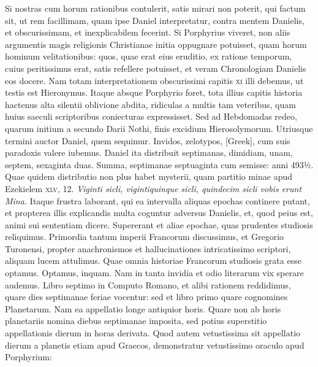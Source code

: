 Si nostras cum horum
rationibus contulerit, satis mirari non poterit, qui factum
sit, ut rem facillimam, quam ipse Daniel interpretatur, contra mentem
Danielis, et obscurissimam, et inexplicabilem fecerint.
Si Porphyrius
viveret, non aliis argumentis magis religionis Christianae
initia oppugnare potuisset, quam horum hominum velitationibus:
quos, quae erat eius eruditio, ex ratione temporum, cuius peritissimus
erat, satis refellere potuisset, et veram Chronologiam
Danielis eos docere.
Nam totam interpretationem obscurissimi
capitis \textsc{xi} illi debemus, ut testis est Hieronymus.
Itaque
absque Porphyrio foret, tota illius capitis historia hactenus alta
silentii oblivione abdita, ridiculas a multis tam veteribus, quam huius
saeculi scriptoribus coniecturas expressisset.
Sed ad Hebdomadas
redeo, quarum initium a secundo Darii Nothi, finis excidium
Hierosolymorum.
Utriusque termini auctor Daniel, quem sequimur.
Invidos, zelotypos, \textgreek{[Greek]}, cum suis paradoxis valere iubemus.
Daniel ita distribuit septimanas, dimidiam, unam, septem,
sexaginta duas.
Summa, septimanae septuaginta cum semisse: anni
493½.
Quae quidem distributio non plus habet mysterii, quam
partitio minae apud Ezekielem \textsc{xlv}, 12.
\textit{Viginti sicli, vigintiquinque
sicli, quindecim sicli vobis erunt Mina.}
Itaque frustra laborant,
qui ea intervalla aliquas epochas continere putant, et propterea
illis explicandis multa coguntur adversus Danielis, et, quod peius
est, animi sui sententiam dicere.
Supererant et aliae epochae, quas
prudentes studiosis reliquimus.
Primordia tantum imperii Francorum
discussimus, et Gregorio Turonensi, propter anachronismos
et hallucinationes intricatissimo scriptori, aliquam lucem attulimus.
Quae omnia historiae Francorum studiosis grata esse optamus.
Optamus, inquam.
Nam in tanta invidia et odio literarum
vix sperare audemus.
Libro septimo in Computo Romano, et alibi
rationem reddidimus, quare dies septimanae feriae vocentur: sed
et libro primo quare cognomines Planetarum.
Nam ea appellatio longe antiquior horis.
Quare non ab horis planetariis nomina diebus
septimanae imposita, sed potius superstitio appellationis dierum
in horas derivata.
Quod autem vetustissima sit appellatio dierum
a planetis etiam apud Graecos, demonstratur vetustissimo oraculo
apud Porphyrium:
